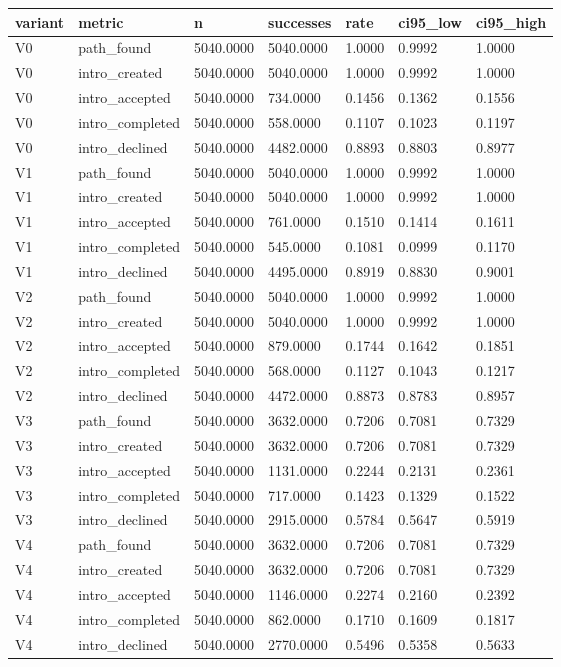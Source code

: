\begin{tabular}{lllllll}
\toprule
variant & metric & n & successes & rate & ci95_low & ci95_high \\
\midrule
V0 & path_found & 5040.0000 & 5040.0000 & 1.0000 & 0.9992 & 1.0000 \\
V0 & intro_created & 5040.0000 & 5040.0000 & 1.0000 & 0.9992 & 1.0000 \\
V0 & intro_accepted & 5040.0000 & 734.0000 & 0.1456 & 0.1362 & 0.1556 \\
V0 & intro_completed & 5040.0000 & 558.0000 & 0.1107 & 0.1023 & 0.1197 \\
V0 & intro_declined & 5040.0000 & 4482.0000 & 0.8893 & 0.8803 & 0.8977 \\
V1 & path_found & 5040.0000 & 5040.0000 & 1.0000 & 0.9992 & 1.0000 \\
V1 & intro_created & 5040.0000 & 5040.0000 & 1.0000 & 0.9992 & 1.0000 \\
V1 & intro_accepted & 5040.0000 & 761.0000 & 0.1510 & 0.1414 & 0.1611 \\
V1 & intro_completed & 5040.0000 & 545.0000 & 0.1081 & 0.0999 & 0.1170 \\
V1 & intro_declined & 5040.0000 & 4495.0000 & 0.8919 & 0.8830 & 0.9001 \\
V2 & path_found & 5040.0000 & 5040.0000 & 1.0000 & 0.9992 & 1.0000 \\
V2 & intro_created & 5040.0000 & 5040.0000 & 1.0000 & 0.9992 & 1.0000 \\
V2 & intro_accepted & 5040.0000 & 879.0000 & 0.1744 & 0.1642 & 0.1851 \\
V2 & intro_completed & 5040.0000 & 568.0000 & 0.1127 & 0.1043 & 0.1217 \\
V2 & intro_declined & 5040.0000 & 4472.0000 & 0.8873 & 0.8783 & 0.8957 \\
V3 & path_found & 5040.0000 & 3632.0000 & 0.7206 & 0.7081 & 0.7329 \\
V3 & intro_created & 5040.0000 & 3632.0000 & 0.7206 & 0.7081 & 0.7329 \\
V3 & intro_accepted & 5040.0000 & 1131.0000 & 0.2244 & 0.2131 & 0.2361 \\
V3 & intro_completed & 5040.0000 & 717.0000 & 0.1423 & 0.1329 & 0.1522 \\
V3 & intro_declined & 5040.0000 & 2915.0000 & 0.5784 & 0.5647 & 0.5919 \\
V4 & path_found & 5040.0000 & 3632.0000 & 0.7206 & 0.7081 & 0.7329 \\
V4 & intro_created & 5040.0000 & 3632.0000 & 0.7206 & 0.7081 & 0.7329 \\
V4 & intro_accepted & 5040.0000 & 1146.0000 & 0.2274 & 0.2160 & 0.2392 \\
V4 & intro_completed & 5040.0000 & 862.0000 & 0.1710 & 0.1609 & 0.1817 \\
V4 & intro_declined & 5040.0000 & 2770.0000 & 0.5496 & 0.5358 & 0.5633 \\
\bottomrule
\end{tabular}
